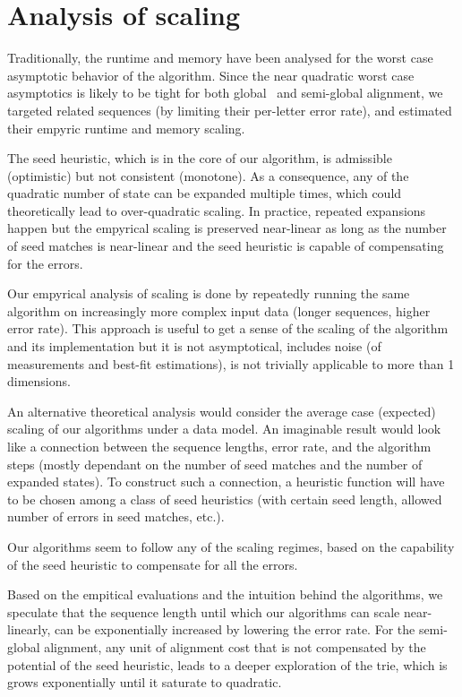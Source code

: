 \section*{Analysis of scaling}

Traditionally, the runtime and memory have been analysed for the worst case
asymptotic behavior of the algorithm. Since the near quadratic worst case
asymptotics is likely to be tight for both global~\citep{backurs2015edit} and
semi-global alignment, we targeted related sequences (by limiting their
per-letter error rate), and estimated their empyric runtime and memory scaling.

The seed heuristic, which is in the core of our \A algorithm, is admissible
(optimistic) but not consistent (monotone). As a consequence, any of the
quadratic number of state can be expanded multiple times, which could
theoretically lead to over-quadratic scaling. In practice, repeated expansions
happen but the empyrical scaling is preserved near-linear as long as the number
of seed matches is near-linear and the seed heuristic is capable of compensating
for the errors.

Our empyrical analysis of scaling is done by repeatedly running the same
algorithm on increasingly more complex input data (\AG longer sequences, higher
error rate). This approach is useful to get a sense of the scaling of the
algorithm and its implementation but it is not asymptotical, includes noise (of
measurements and best-fit estimations), is not trivially applicable to more than
1 dimensions.

An alternative theoretical analysis would consider the average case (expected)
scaling of our algorithms under a data model. An imaginable result would look
like a connection between the sequence lengths, error rate, and the algorithm
steps (mostly dependant on the number of seed matches and the number of expanded
states). To construct such a connection, a heuristic function will have to be
chosen among a class of seed heuristics (\AG with certain seed length, allowed
number of errors in seed matches, etc.).

Our algorithms seem to follow any of the scaling regimes, based on the
capability of the seed heuristic to compensate for all the errors.

Based on the empitical evaluations and the intuition behind the algorithms, we
speculate that the sequence length until which our algorithms can scale
near-linearly, can be exponentially increased by lowering the error rate. For
the semi-global alignment, any unit of alignment cost that is not compensated by
the potential of the seed heuristic, leads to a deeper exploration of the trie,
which is grows exponentially until it saturate to quadratic.
